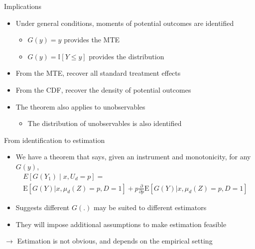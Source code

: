 \documentclass{beamer}
\newcommand{\E}{\mathrm{E}} %
\begin{document}
\begin{frame}{Implications}

\begin{itemize}

\item Under general conditions, moments of potential outcomes are
  identified
\begin{itemize}
\item $G(y) = y$ provides the MTE

\item $G(y) = \mathbb{I} \left[ Y \leq y \right]$ provides the
  distribution
\end{itemize}

\pause

\item From the MTE, recover all standard treatment effects

\item From the CDF, recover the density of potential outcomes

\pause

\item The theorem also applies to unobservables
\begin{itemize}
\item The distribution of unobservables is also identified
\end{itemize}

\end{itemize}

\end{frame}


\begin{frame}{From identification to estimation}
  \begin{itemize}
  \item We have a theorem that says, given an instrument and monotonicity, for any $G(y)$,
    \begin{multline*}
      E[G(Y_1)\mid x, U_d=p] = \\ \E \left[ G(Y) | x, \mu_d(Z) = p, D = 1 \right] + p \frac{\partial}{\partial p} \E\left[ G(Y) |  x, \mu_d(Z) = p, D = 1 \right]
    \end{multline*}
  \item Suggests different $G(.)$ may be suited to different estimators
    \item They will impose additional assumptions to make estimation feasible
  \end{itemize}
    $\rightarrow$ Estimation is not obvious, and depends on the empirical setting
  
  
\end{frame}
\end{document}
